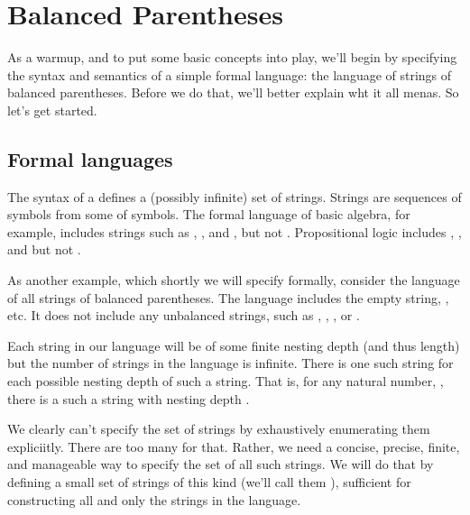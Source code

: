 \documentclass[letterpaper,10pt,english]{sphinxmanual}
\begin{document}
\section{Balanced Parentheses}
\label{\detokenize{A_01_Propositional_Logic:balanced-parentheses}}
\sphinxAtStartPar
As a warmup, and to put some basic
concepts into play, we’ll begin by specifying the syntax
and semantics of a simple formal language: the language of
strings of balanced parentheses. Before we do that, we’ll
better explain wht it all menas. So let’s get started.


\subsection{Formal languages}
\label{\detokenize{A_01_Propositional_Logic:formal-languages}}
\sphinxAtStartPar
The syntax of a  defines a (possibly
infinite) set of strings. Strings are sequences of symbols
from some  of symbols. The formal language of basic
algebra, for example, includes strings such as , , and
, but not . Propositional logic includes , ,
and  but not .

\sphinxAtStartPar
As another example, which shortly we will specify formally,
consider the language of all strings of balanced parentheses.
The language includes the empty string, \sphinxstyleemphasis{(), (()), ((()))},
etc.  It does not include any unbalanced strings, such as
\sphinxstyleemphasis{(}, \sphinxstyleemphasis{)}, \sphinxstyleemphasis{((}, or \sphinxstyleemphasis{(()}.

\sphinxAtStartPar
Each string in our language will be of some finite nesting
depth (and thus length) but the number of strings in the
language is infinite. There is one such string for each
possible nesting depth of such a string. That is, for any
natural number, , there is a such a string with nesting
depth .

\sphinxAtStartPar
We clearly can’t specify the set of strings by exhaustively
enumerating them expliciitly. There are too many for that.
Rather, we need a concise, precise, finite, and manageable
way to specify the set of all such strings. We will do that
by defining a small set of  strings
of this kind (we’ll call them ), sufficient for
constructing all and only the strings in the language.
\end{document}
